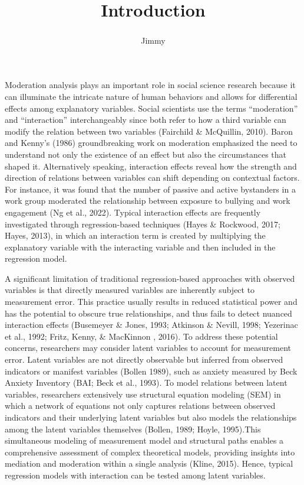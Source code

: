 \documentclass[
  man]{apa7}
\title{Introduction}
\author{Jimmy\textsuperscript{}}
\date{}
\affiliation{\phantom{0}}
\begin{document}
\maketitle

Moderation analysis plays an important role in social science research because it can illuminate the intricate nature of human behaviors and allows for differential effects among explanatory variables. Social scientists use the terms ``moderation'' and ``interaction'' interchangeably since both refer to how a third variable can modify the relation between two variables (Fairchild \& McQuillin, 2010). Baron and Kenny's (1986) groundbreaking work on moderation emphasized the need to understand not only the existence of an effect but also the circumstances that shaped it. Alternatively speaking, interaction effects reveal how the strength and direction of relations between variables can shift depending on contextual factors. For instance, it was found that the number of passive and active bystanders in a work group moderated the relationship between exposure to bullying and work engagement (Ng et al., 2022). Typical interaction effects are frequently investigated through regression-based techniques (Hayes \& Rockwood, 2017; Hayes, 2013), in which an interaction term is created by multiplying the explanatory variable with the interacting variable and then included in the regression model.

A significant limitation of traditional regression-based approaches with observed variables is that directly measured variables are inherently subject to measurement error. This practice usually results in reduced statistical power and has the potential to obscure true relationships, and thus fails to detect nuanced interaction effects (Busemeyer \& Jones, 1993; Atkinson \& Nevill, 1998; Yezerinac et al., 1992; Fritz, Kenny, \& MacKinnon , 2016). To address these potential concerns, researchers may consider latent variables to account for measurement error. Latent variables are not directly observable but inferred from observed indicators or manifest variables (Bollen 1989), such as anxiety measured by Beck Anxiety Inventory (BAI; Beck et al., 1993). To model relations between latent variables, researchers extensively use structural equation modeling (SEM) in which a network of equations not only captures relations between observed indicators and their underlying latent variables but also models the relationships among the latent variables themselves (Bollen, 1989; Hoyle, 1995).This simultaneous modeling of measurement model and structural paths enables a comprehensive assessment of complex theoretical models, providing insights into mediation and moderation within a single analysis (Kline, 2015). Hence, typical regression models with interaction can be tested among latent variables.
\end{document}
